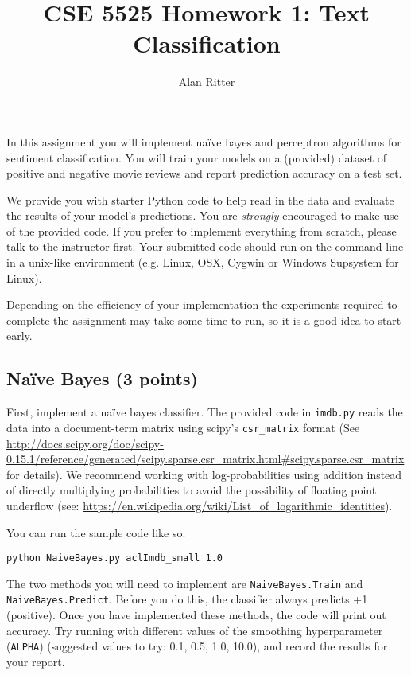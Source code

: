 \documentclass[12pt, letterpaper]{article}
\begin{document}
\title{CSE 5525 Homework 1: Text Classification}
\author{Alan Ritter}
\date{}
\maketitle
 
In this assignment you will implement na\"{i}ve bayes and perceptron algorithms for
sentiment classification.  You will train your models on a (provided) dataset of positive
and negative movie reviews and report prediction accuracy on a test set.

We provide you with starter Python code to help read in the data and evaluate the results of your model's predictions.
You are \emph{strongly} encouraged to make use of the provided code.  
If you prefer to implement everything from scratch, please talk to the instructor first.  Your submitted code
should run on the command line in a unix-like environment (e.g. Linux, OSX, Cygwin or Windows Supsystem for Linux).

Depending on the efficiency of your implementation the experiments required to complete the assignment may take some
time to run, so it is a good idea to start early.

\subsection*{Na\"{i}ve Bayes (3 points)}
First, implement a na\"{i}ve bayes classifier.  The provided code in {\tt imdb.py} reads the data into a document-term matrix
using scipy's {\tt csr\_matrix} format (See \url{http://docs.scipy.org/doc/scipy-0.15.1/reference/generated/scipy.sparse.csr_matrix.html#scipy.sparse.csr_matrix} for details).
We recommend working with log-probabilities using addition instead of directly multiplying probabilities to avoid the possibility of floating point underflow (see: \url{https://en.wikipedia.org/wiki/List_of_logarithmic_identities}).

You can run the sample code like so:
\begin{verbatim}
python NaiveBayes.py aclImdb_small 1.0
\end{verbatim}

The two methods you will need to implement are {\tt NaiveBayes.Train} and {\tt NaiveBayes.Predict}.  Before you do this, the classifier always predicts +1 (positive).
Once you have implemented these methods, the code will print out accuracy.  Try running with different values of the smoothing hyperparameter ({\tt ALPHA}) (suggested values to try: 0.1, 0.5, 1.0, 10.0),
and record the results for your report.
\end{document}
